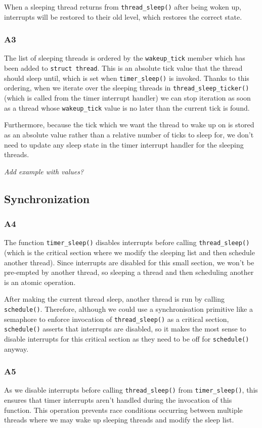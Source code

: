 \documentclass[a4wide, 11pt]{article}
\newcommand{\tx}{\texttt}
\begin{document}
When a sleeping thread returns from \texttt{thread\_sleep()} after being woken up, interrupts will be restored to their old level, which restores the correct state.

\subsubsection{A3}

The list of sleeping threads is ordered by the \tx{wakeup\_tick} member
which has been added to \tx{struct thread}. This is an absolute tick value that the thread 
should sleep until, which is set when \tx{timer\_sleep()} is invoked. Thanks to this ordering, when we iterate over the sleeping threads in \tx{thread\_sleep\_ticker()} (which is called from the
timer interrupt handler) we can stop iteration as soon as a thread whose \tx{wakeup\_tick} value is no later than the current tick is found.

Furthermore, because the tick which we want the thread to wake up on is stored as
an absolute value rather than a relative number of ticks to sleep for, we don't
need to update any sleep state in the timer interrupt handler for the sleeping
threads.

\emph{Add example with values?}

\subsection{Synchronization}
\subsubsection{A4}
The function \tx{timer\_sleep()} disables interrupts before calling \tx{thread\_sleep()} (which is the critical section where we modify the sleeping list and then schedule 
another thread). Since interrupts are disabled for this small section, we won't 
be pre-empted by another thread, so sleeping a thread and then scheduling 
another is an atomic operation.

After making the current thread sleep, another thread is run by calling \tx{schedule()}. Therefore, although we could use a synchronisation primitive like a semaphore to enforce invocation of \tx{thread\_sleep()} as a critical section, \tx{schedule()} asserts that interrupts are disabled, so it makes the most sense to disable interrupts for this critical section as they need to be off for \tx{schedule()} anyway.

\subsubsection{A5}
As we disable interrupts before calling \tx{thread\_sleep()} from \tx{timer\_sleep()}, this ensures that timer interrupts aren't handled during the invocation of this function. This operation prevents race conditions occurring between multiple threads where
we may wake up sleeping threads and modify the sleep list.
\end{document}
